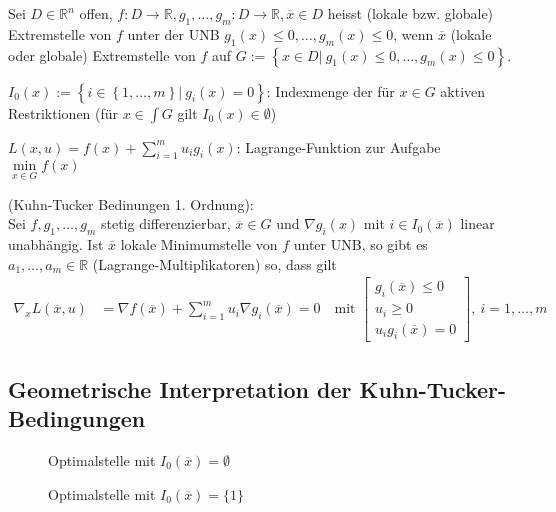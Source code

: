 \begin{defi}
Sei $D\in\mathbb{R}^n$ offen, $f:D\rightarrow\mathbb{R},g_1,\ldots,g_m:D\rightarrow\mathbb{R},\overline{x}\in D$ heisst (lokale bzw. globale) Extremstelle von $f$ unter der \ac{UNB}
$g_1(x)\le 0,\ldots,g_m(x)\le 0$, wenn $\overline{x}$ (lokale oder globale) Extremstelle von $f$ auf $G:=\left\{x\in D|\ g_1(x)\le 0,\ldots,g_m(x)\le 0\right\}$.
\end{defi}
\begin{defi}
$I_0(x):=\left\{ i\in\left\{ 1,\ldots,m \right\}|\ g_i(x)=0 \right\}$: Indexmenge der für $x\in G$ aktiven Restriktionen (für $x\in\int G$ gilt $I_0(x)\in\emptyset$)
\end{defi}
$L(x,u)=f(x)+\sum\limits_{i=1}^{m}u_ig_i(x)$: Lagrange-Funktion zur Aufgabe $\min\limits_{x\in G}f(x)$
\begin{satz}\label{satz:4}
	(Kuhn-Tucker Bedinungen 1. Ordnung):\\
	Sei $f,g_1,\ldots,g_m$ stetig differenzierbar, $\overline{x}\in G$ und $\nabla g_i(x)$ mit $i\in I_0(\overline{x})$ linear unabhängig. Ist $\overline{x}$ lokale Minimumstelle von $f$
	unter \ac{UNB}, so gibt es $a_1,\ldots,a_m\in\mathbb{R}$ (Lagrange-Multiplikatoren) so, dass gilt
	\begin{align*}
	\nabla_x L(\overline{x},u) & = \nabla f(\overline{x})+\sum\limits_{i=1}^m u_i\nabla g_i(\overline{x})= 0\quad\text{mit } \begin{bmatrix}
	g_i(\overline{x})\le 0\\ u_i\ge 0\\ u_ig_i(\overline{x})=0
	\end{bmatrix},\ i=1,\ldots,m
	\end{align*}
\end{satz}
\subsection{Geometrische Interpretation der Kuhn-Tucker-Bedingungen}
\begin{figure}[!htb]
	\centering
	
	\caption{Optimalstelle mit $I_0(\overline{x})=\emptyset$}
	\label{fig:kap_1_ktb_opt_0}
\end{figure}

\begin{figure}[!htb]
	\centering
	
	\caption{Optimalstelle mit $I_0(\overline{x})=\{1\}$}
	\label{fig:kap_1_ktb_opt_1}
\end{figure}

